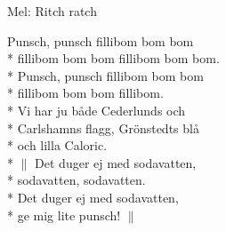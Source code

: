 \begin{SongText}
    \begin{SongInfo}
        Mel: Ritch ratch
    \end{SongInfo}
    \begin{SongVerse}
        Punsch, punsch fillibom bom bom\\*%
        fillibom bom bom fillibom bom bom.\\*%
        Punsch, punsch fillibom bom bom\\*%
        fillibom bom bom fillibom.\\*%
        Vi har ju både Cederlunds och\\*%
        Carlshamns flagg, Grönstedts blå\\*%
        och lilla Caloric.\\*%
        $\|$ Det duger ej med sodavatten,\\*%
        sodavatten, sodavatten.\\*%
        Det duger ej med sodavatten,\\*%
        ge mig lite punsch! $\|$
    \end{SongVerse}\end{SongText}
